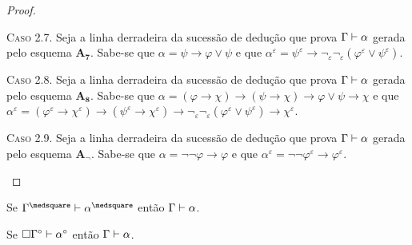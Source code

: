 \begin{theorem}
\begin{proof}
                \begin{subcase}
                    \textsc{Caso 2.7.}
                    Seja a linha derradeira da sucessão de dedução que prova $\Gamma\mathrel{\vdash}\alpha$ gerada pelo esquema $\hyperref[MA7]{\mathbf{A_7}}$.
                    Sabe-se que $\alpha=\psi\to\varphi\vee\psi$ e que $\alpha^\varepsilon=\psi^\varepsilon\to\neg_\varepsilon\neg_\varepsilon(\varphi^\varepsilon\vee\psi^\varepsilon)$.
                \end{subcase}

                \begin{subcase}
                    \textsc{Caso 2.8.}
                    Seja a linha derradeira da sucessão de dedução que prova $\Gamma\mathrel{\vdash}\alpha$ gerada pelo esquema $\hyperref[MA8]{\mathbf{A_8}}$.
                    Sabe-se que $\alpha=(\varphi\to\chi)\to(\psi\to\chi)\to\varphi\vee\psi\to\chi$ e que $\alpha^\varepsilon=(\varphi^\varepsilon\to\chi^\varepsilon)\to(\psi^\varepsilon\to\chi^\varepsilon)\to\neg_\varepsilon\neg_\varepsilon(\varphi^\varepsilon\vee\psi^\varepsilon)\to\chi^\varepsilon$.
                \end{subcase}

                \begin{subcase}
                    \textsc{Caso 2.9.}
                    Seja a linha derradeira da sucessão de dedução que prova $\Gamma\mathrel{\vdash}\alpha$ gerada pelo esquema $\hyperref[MANEG]{\mathbf{A_\neg}}$.
                    Sabe-se que $\alpha=\neg\neg\varphi\to\varphi$ e que $\alpha^\varepsilon=\neg\neg\varphi^\varepsilon\to\varphi^\varepsilon$.
                \end{subcase}
        \end{proof}
    \end{theorem}

    \begin{theorem}
        Se $\Gamma^\medsquare\entails\alpha^\medsquare$ então $\Gamma\mathrel{\vdash}\alpha$.
    \end{theorem}

    \begin{theorem}
        Se $\Box\Gamma^\circ\mathrel{\vdash}\alpha^\circ$ então $\Gamma\mathrel{\vdash}\alpha$.
    \end{theorem}

